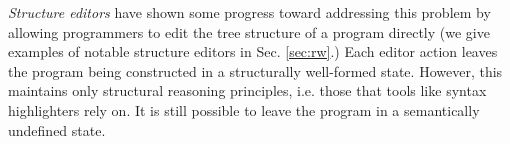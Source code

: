 

\emph{Structure editors} have shown some progress toward addressing this
problem by allowing programmers to edit the tree structure of a program
directly (we give examples of notable structure editors in Sec. \ref{sec:rw}.) Each editor action leaves the program being constructed in a
structurally well-formed state. However, this maintains only structural
reasoning principles, i.e. those that tools like syntax highlighters rely
on. It is still possible to leave the program in a semantically undefined state.


